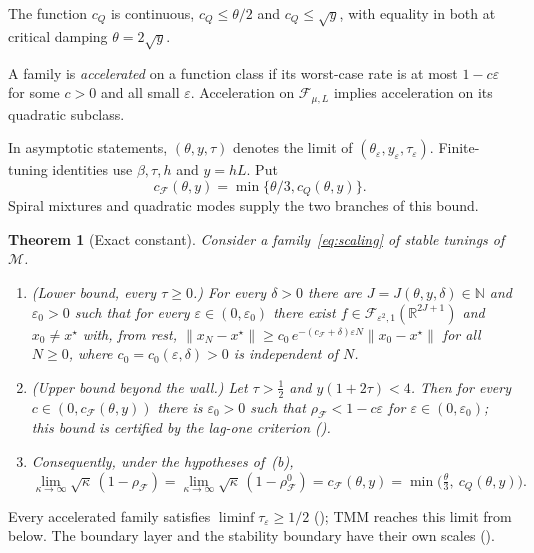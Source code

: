 \documentclass[11pt]{article}
\newtheorem{theorem}{Theorem}[section]
\theoremstyle{definition}
\theoremstyle{remark}
\newcommand{\R}{\mathbb R}
\newcommand{\N}{\mathbb N}
\newcommand{\cF}{\mathcal F}
\newcommand{\cM}{\mathcal M}
\newcommand{\norm}[1]{\lVert #1\rVert}
\newcommand{\rhoF}{\rho_{\cF}}
\newcommand{\rhoz}{\rho_{\cF}^{0}}
\newcommand{\cQ}{c_{Q}}
\newcommand{\cFF}{c_{\cF}}
\begin{document}
The function \(\cQ\) is continuous, \(\cQ\le\theta/2\) and \(\cQ\le\sqrt y\),
with equality in both at critical damping \(\theta=2\sqrt y\).

A family is \emph{accelerated} on a function class if its worst-case rate
is at most \(1-c\varepsilon\) for some \(c>0\) and all small \(\varepsilon\).
Acceleration on \(\cF_{\mu,L}\) implies acceleration on its quadratic subclass.

In asymptotic statements, \((\theta,y,\tau)\) denotes the limit of
\((\theta_\varepsilon,y_\varepsilon,\tau_\varepsilon)\).
Finite-tuning identities use \(\beta,\tau,h\) and \(y=hL\).  Put
\begin{equation}\label{eq:mainconstant}
\cFF(\theta,y)=\min\{\theta/3,\cQ(\theta,y)\}.
\end{equation}
Spiral mixtures and quadratic modes supply the two branches of this bound.

\begin{theorem}[Exact constant]\label{thm:B}
Consider a family~\eqref{eq:scaling} of stable tunings of \(\cM\).
\begin{enumerate}[label=\textup{(\alph*)}]
\item \textup{(Lower bound, every \(\tau\ge0\).)}  For every \(\delta>0\) there
are \(J=J(\theta,y,\delta)\in\N\) and \(\varepsilon_0>0\) such that for every
\(\varepsilon\in(0,\varepsilon_0)\) there exist
\(f\in\cF_{\varepsilon^2,1}(\R^{2J+1})\) and \(x_0\ne x^\star\) with, from rest,
\(\norm{x_N-x^\star}\ge c_0\,e^{-(\cFF+\delta)\varepsilon N}\norm{x_0-x^\star}\)
for all \(N\ge0\), where \(c_0=c_0(\varepsilon,\delta)>0\) is independent of \(N\).
\item \textup{(Upper bound beyond the wall.)}  Let \(\tau>\frac12\) and \(y(1+2\tau)<4\).  Then for every \(c\in(0,\cFF(\theta,y))\)
there is \(\varepsilon_0>0\) such that \(\rhoF<1-c\varepsilon\) for
\(\varepsilon\in(0,\varepsilon_0)\); this bound is certified by the lag-one
criterion ().
\item Consequently, under the hypotheses of~(b),
\[
\lim_{\kappa\to\infty}\sqrt\kappa\,(1-\rhoF)=\lim_{\kappa\to\infty}\sqrt\kappa\,(1-\rhoz)=\cFF(\theta,y)=\min\bigl(\tfrac\theta3,\ \cQ(\theta,y)\bigr).
\]
\end{enumerate}
\end{theorem}

Every accelerated family satisfies \(\liminf\tau_\varepsilon\ge1/2\)
(); TMM reaches this limit from below.
The boundary layer and the stability boundary have their own scales
().
\end{document}
